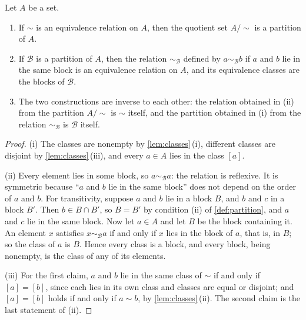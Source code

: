 \begin{theorem}
\label{thm:partition}
Let $A$ be a set.
\begin{enumerate}
\item If $\sim$ is an equivalence relation on $A$, then the quotient set $A/{\sim}$ is a partition of $A$.
\item If $\mathcal B$ is a partition of $A$, then the relation $\sim_{\mathcal B}$ defined by $a\sim_{\mathcal B}b$ if $a$ and $b$ lie in the same block is an equivalence relation on $A$, and its equivalence classes are the blocks of $\mathcal B$.
\item The two constructions are inverse to each other: the relation obtained in (ii) from the partition $A/{\sim}$ is $\sim$ itself, and the partition obtained in (i) from the relation $\sim_{\mathcal B}$ is $\mathcal B$ itself.
\end{enumerate}
\end{theorem}

\begin{proof}
(i) The classes are nonempty by \cref{lem:classes}\,(i), different classes are disjoint by \cref{lem:classes}\,(iii), and every $a\in A$ lies in the class $[a]$.

(ii) Every element lies in some block, so $a\sim_{\mathcal B}a$: the relation is reflexive. It is symmetric because ``$a$ and $b$ lie in the same block'' does not depend on the order of $a$ and $b$. For transitivity, suppose $a$ and $b$ lie in a block $B$, and $b$ and $c$ in a block $B'$. Then $b\in B\cap B'$, so $B=B'$ by condition (ii) of \cref{def:partition}, and $a$ and $c$ lie in the same block. Now let $a\in A$ and let $B$ be the block containing it. An element $x$ satisfies $x\sim_{\mathcal B}a$ if and only if $x$ lies in the block of $a$, that is, in $B$; so the class of $a$ is $B$. Hence every class is a block, and every block, being nonempty, is the class of any of its elements.

(iii) For the first claim, $a$ and $b$ lie in the same class of $\sim$ if and only if $[a]=[b]$, since each lies in its own class and classes are equal or disjoint; and $[a]=[b]$ holds if and only if $a\sim b$, by \cref{lem:classes}\,(ii). The second claim is the last statement of (ii).
\end{proof}

